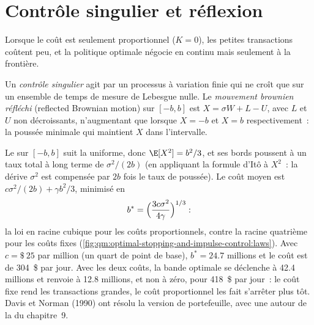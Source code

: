 \section{Contrôle singulier et réflexion}

Lorsque le coût est seulement proportionnel ($K = 0$), les petites transactions coûtent peu, et la politique optimale négocie en continu mais seulement
à la frontière.

\begin{definition}\label{def:qm:optimal-stopping-and-impulse-control:singular}
Un \emph{contrôle singulier} agit par un processus à variation finie qui ne croît que sur un ensemble
de temps de mesure de Lebesgue nulle. Le \emph{mouvement brownien réfléchi} (reflected Brownian motion) sur $[-b, b]$ est $X =
\sigma W + L - U$, avec $L$ et $U$ non décroissants, n'augmentant que lorsque $X = -b$ et $X = b$ respectivement~: la poussée minimale qui maintient $X$
dans l'intervalle.
\end{definition}

Le  sur $[-b, b]$ suit la  uniforme, donc $\E[X^2] = b^2/3$, et ses bords poussent à un taux total
à long terme de $\sigma^2/(2b)$ (en appliquant la formule d'Itô à $X^2$~: la dérive $\sigma^2$ est compensée par $2b$ fois le taux de poussée). Le
coût moyen est $c\sigma^2/(2b) + \gamma b^2/3$, minimisé en
\[
b^* = \Bigl(\frac{3c\sigma^2}{4\gamma}\Bigr)^{1/3}:
\]
la loi en racine cubique pour les coûts proportionnels, contre la racine quatrième pour les coûts fixes
(\cref{fig:qm:optimal-stopping-and-impulse-control:laws}). Avec $c = \text{\$}~25$ par million (un quart de point de base),
$b^* = 24.7$ millions et le coût est de 304~\$ par jour. Avec les deux coûts, la bande optimale se déclenche à 42.4 millions et renvoie
à 12.8 millions, et non à zéro, pour 418~\$ par jour~: le coût fixe rend les transactions grandes, le coût proportionnel les fait s'arrêter plus tôt.
Davis et Norman (1990) ont résolu la version de portefeuille, avec une  autour de la  du chapitre~9.

